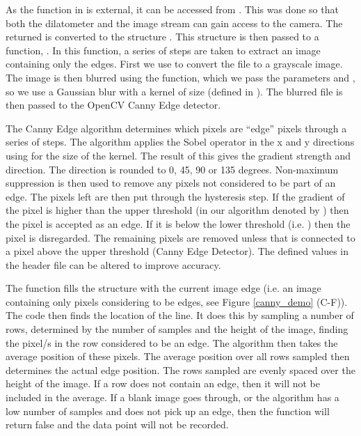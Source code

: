 As the  function in  is external, it can be accessed from .  This was done so that both the dilatometer and the image stream can gain access to the camera.  The  returned is converted to the  structure .  This  structure is then passed to a function, .  In this function, a series of steps are taken to extract an image containing only the edges.  First we use  to convert the  file to a grayscale image.  The image is then blurred using the  function, which we pass the parameters  and , so  we use a Gaussian blur with a kernel of size  (defined in ).  The blurred file is then passed to the OpenCV Canny Edge detector.  

The Canny Edge algorithm\cite{OpenCV_Canny} determines which pixels are ``edge'' pixels through a series of steps.  The algorithm applies the Sobel operator in the x and y directions using  for the size of the kernel.  The result of this gives the gradient strength and direction. The direction is rounded to 0, 45, 90 or 135 degrees. Non-maximum suppression is then used to remove any pixels not considered to be part of an edge.  The pixels left are then put through the hysteresis step.  If the gradient of the pixel is higher than the upper threshold (in our algorithm denoted by ) then the pixel is accepted as an edge.  If it is below the lower threshold (i.e. ) then the pixel is disregarded.  The remaining pixels are removed unless that is connected to a pixel above the upper threshold (Canny Edge Detector). The defined values in the header file can be altered to improve accuracy.

The  function fills the   structure with the current image edge (i.e. an image containing only pixels considering to be edges, see Figure \ref{canny_demo} (C-F)). The code then finds the location of the line.  It does this by sampling a number of rows, determined by the number of samples and the height of the image, finding the pixel/s in the row considered to be an edge.  The algorithm then takes the average position of these pixels.  The average position over all rows sampled then determines the actual edge position.  The rows sampled are evenly spaced over the height of the image.  If a row does not contain an edge, then it will not be included in the average.  If a blank image goes through, or the algorithm has a low number of samples and does not pick up an edge, then the function will return false and the data point will not be recorded.

